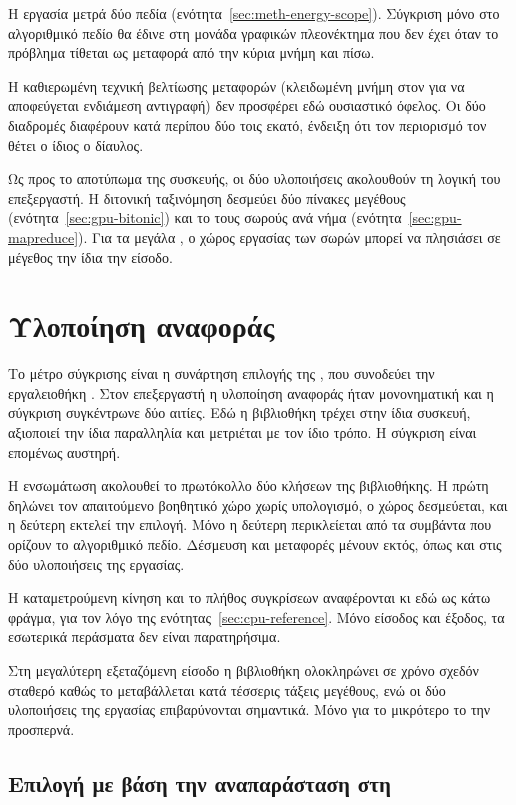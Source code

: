 Η εργασία μετρά δύο πεδία (ενότητα~\ref{sec:meth-energy-scope}). Σύγκριση μόνο
στο αλγοριθμικό πεδίο θα έδινε στη μονάδα γραφικών πλεονέκτημα που δεν έχει
όταν το πρόβλημα τίθεται ως μεταφορά από την κύρια μνήμη και πίσω.

Η καθιερωμένη τεχνική βελτίωσης μεταφορών (κλειδωμένη μνήμη στον  για
να αποφεύγεται ενδιάμεση αντιγραφή) δεν προσφέρει εδώ ουσιαστικό όφελος. Οι δύο
διαδρομές διαφέρουν κατά περίπου δύο τοις εκατό, ένδειξη ότι τον περιορισμό τον
θέτει ο ίδιος ο δίαυλος.

Ως προς το αποτύπωμα της συσκευής, οι δύο υλοποιήσεις ακολουθούν τη λογική του
επεξεργαστή. Η διτονική ταξινόμηση δεσμεύει δύο πίνακες μεγέθους 
(ενότητα~\ref{sec:gpu-bitonic}) και το  τους σωρούς ανά νήμα
(ενότητα~\ref{sec:gpu-mapreduce}). Για τα μεγάλα , ο χώρος εργασίας των
σωρών μπορεί να πλησιάσει σε μέγεθος την ίδια την είσοδο.

\section{Υλοποίηση αναφοράς}
\label{sec:gpu-reference}

Το μέτρο σύγκρισης είναι η συνάρτηση επιλογής  της , που
συνοδεύει την εργαλειοθήκη . Στον επεξεργαστή η υλοποίηση αναφοράς
ήταν μονονηματική και η σύγκριση συγκέντρωνε δύο αιτίες. Εδώ η βιβλιοθήκη
τρέχει στην ίδια συσκευή, αξιοποιεί την ίδια παραλληλία και μετριέται με τον
ίδιο τρόπο. Η σύγκριση είναι επομένως αυστηρή.

Η ενσωμάτωση ακολουθεί το πρωτόκολλο δύο κλήσεων της βιβλιοθήκης. Η πρώτη
δηλώνει τον απαιτούμενο βοηθητικό χώρο χωρίς υπολογισμό, ο χώρος δεσμεύεται,
και η δεύτερη εκτελεί την επιλογή. Μόνο η δεύτερη περικλείεται από τα συμβάντα
που ορίζουν το αλγοριθμικό πεδίο. Δέσμευση και μεταφορές μένουν εκτός, όπως και
στις δύο υλοποιήσεις της εργασίας.

Η καταμετρούμενη κίνηση και το πλήθος συγκρίσεων αναφέρονται κι εδώ ως κάτω
φράγμα, για τον λόγο της ενότητας~\ref{sec:cpu-reference}. Μόνο είσοδος και
έξοδος, τα εσωτερικά περάσματα δεν είναι παρατηρήσιμα.

Στη μεγαλύτερη εξεταζόμενη είσοδο η βιβλιοθήκη ολοκληρώνει σε χρόνο σχεδόν
σταθερό καθώς το  μεταβάλλεται κατά τέσσερις τάξεις μεγέθους, ενώ οι δύο
υλοποιήσεις της εργασίας επιβαρύνονται σημαντικά. Μόνο για το μικρότερο 
το  την προσπερνά.

\subsection{Επιλογή με βάση την αναπαράσταση στη }
\label{sec:gpu-reference-cub}

